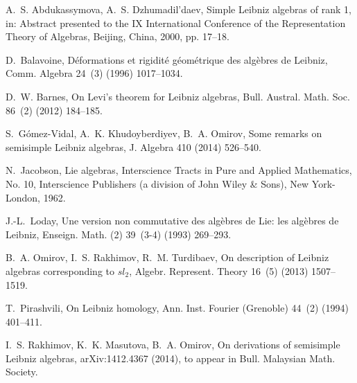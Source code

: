 \documentclass[12pt,reqno]{amsart}
\numberwithin{equation}{section}
\begin{document}
\begin{thebibliography}{9}

A.~S. Abdukassymova, A.~S. Dzhumadil'daev, Simple {L}eibniz algebras of rank 1,
  in: Abstract presented to the IX International Conference of the
  Representation Theory of Algebras, Beijing, China, 2000, pp. 17--18.

D.~Balavoine, D\'eformations et rigidit\'e g\'eom\'etrique des alg\`ebres de
  {L}eibniz, Comm. Algebra 24~(3) (1996) 1017--1034.

D.~W. Barnes, On {L}evi's theorem for {L}eibniz algebras, Bull. Austral. Math.
  Soc. 86~(2) (2012) 184--185.

S.~G{\'o}mez-Vidal, A.~K. Khudoyberdiyev, B.~A. Omirov, Some remarks on
  semisimple {L}eibniz algebras, J. Algebra 410 (2014) 526--540.

N.~Jacobson, Lie algebras, Interscience Tracts in Pure and Applied Mathematics,
  No. 10, Interscience Publishers (a division of John Wiley \& Sons), New
  York-London, 1962.

{\relax J.-L}.~Loday, Une version non commutative des alg\`ebres de {L}ie: les
  alg\`ebres de {L}eibniz, Enseign. Math. (2) 39~(3-4) (1993) 269--293.

B.~A. Omirov, I.~S. Rakhimov, R.~M. Turdibaev, On description of {L}eibniz
  algebras corresponding to {$sl_2$}, Algebr. Represent. Theory 16~(5) (2013)
  1507--1519.

T.~Pirashvili, On {L}eibniz homology, Ann. Inst. Fourier (Grenoble) 44~(2)
  (1994) 401--411.

I.~S. Rakhimov, K.~K. Masutova, B.~A. Omirov, On derivations of semisimple
  {L}eibniz algebras, arXiv:1412.4367 (2014), to appear in Bull. Malaysian Math. Society.
  
\end{thebibliography}
\end{document}
